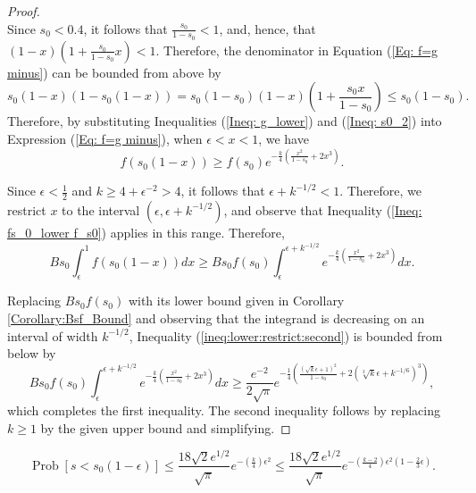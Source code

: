 \documentclass[twoside,11pt]{article}
\newcommand{\pP}[1]{\operatorname{Prob}\left[ #1 \right] }
\begin{document}
\begin{proof}
\begin{equation}
						\end{equation}
						Since $s_0<0.4$, it follows that $\frac{s_0}{1-s_0}<1$, and, hence, that $(1-x)\left(1+\frac{s_0}{1-s_0}x\right)<1$.  Therefore, the denominator in Equation (\ref{Eq: f=g minus}) can be bounded from above by 
												\begin{equation} \label{Ineq: s0_2}
						  s_0(1-x)\left(1-s_0(1-x)\right)= s_0(1-s_0)(1-x)\left(1+\frac{s_0x}{1-s_0} \right) \leq s_0(1-s_0).
						 \end{equation}
						 Therefore, by substituting Inequalities (\ref{Ineq: g_lower}) and (\ref{Ineq: s0_2}) into Expression (\ref{Eq: f=g minus}), when $\epsilon<x<1$, we have
						 						\begin{equation} \label{Ineq: fs_0_lower f_s0}
						f(s_0(1-x)) \geq f(s_0)e^{	- \frac{k}{4}\left(\frac{x^2}{1-s_0} + 2x^3 \right)}. 
						\end{equation}
												
						Since $\epsilon<\frac{1}{2}$ and $k\geq 4+\epsilon^{-2}>4$, it follows that $\epsilon+k^{-1/2}<1$.  Therefore, we restrict $x$ to the interval $(\epsilon,\epsilon+k^{-1/2})$, and observe that Inequality (\ref{Ineq: fs_0_lower f_s0}) applies in this range.  Therefore,
						\begin{equation}\label{ineq:lower:restrict:second}
							Bs_0  \int_{\epsilon}^1 f(s_0(1-x))dx \geq Bs_0 f(s_0) \int_\epsilon^{\epsilon+k^{-1/2}} e^{ - \frac{k}{4}\left(\frac{x^2}{1-s_0} + 2x^3 \right)} 																										dx.
							\end{equation}
											
					Replacing $Bs_0f(s_0)$ with its lower bound given in Corollary \ref{Corollary:Bsf_Bound} and observing that the integrand is decreasing on an interval of width $k^{-1/2}$, Inequality (\ref{ineq:lower:restrict:second}) is bounded from below by 
							$$
								Bs_0 f(s_0)\int_\epsilon^{\epsilon+k^{-1/2}} e^{ - \frac{k}{4}\left(\frac{x^2}{1-s_0} + 2x^3 \right)} dx  \geq   \frac{e^{-2}}{2\sqrt{\pi}} e^{	- 
								\frac{1}{4}\left(\frac{(\sqrt{k} \epsilon + 1)^2}{1-s_0} + 2(\sqrt[3]{k} \epsilon + k^{-1/6})^3\right)},
							$$
					which completes the first inequality.  The second inequality follows by replacing $k\geq 1$ by the given upper bound and simplifying.					
			\end{proof}	
					
	
\begin{lemma} 
	\[  \pP{s<s_0(1-\epsilon)} \leq \frac{18\sqrt{2}e^{1/2}}{\sqrt{\pi}} e^{-\left(\frac{k}{4}\right)\epsilon^2}\leq \frac{18\sqrt{2}e^{1/2}}{\sqrt{\pi}} e^{-\left(\frac{k-2}{4}\right)\epsilon^2\left(1-\frac{2}{3}\epsilon\right)}.  \]
\end{lemma}
				
\end{document}
